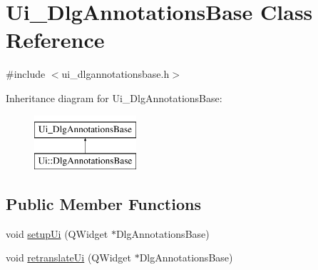\hypertarget{classUi__DlgAnnotationsBase}{\section{Ui\+\_\+\+Dlg\+Annotations\+Base Class Reference}
\label{classUi__DlgAnnotationsBase}
}


{\ttfamily \#include $<$ui\+\_\+dlgannotationsbase.\+h$>$}

Inheritance diagram for Ui\+\_\+\+Dlg\+Annotations\+Base\+:\begin{figure}[H]
\begin{center}
\leavevmode
\includegraphics[height=2.000000cm]{classUi__DlgAnnotationsBase}
\end{center}
\end{figure}
\subsection*{Public Member Functions}
\begin{DoxyCompactItemize}
\item 
void \hyperlink{classUi__DlgAnnotationsBase_a078236dd18dd8f77ded02753ee3c2b7f}{setup\+Ui} (Q\+Widget $\ast$Dlg\+Annotations\+Base)
\item 
void \hyperlink{classUi__DlgAnnotationsBase_ae7015323b8a7199ad8daf9fd730761b7}{retranslate\+Ui} (Q\+Widget $\ast$Dlg\+Annotations\+Base)
\end{DoxyCompactItemize}
